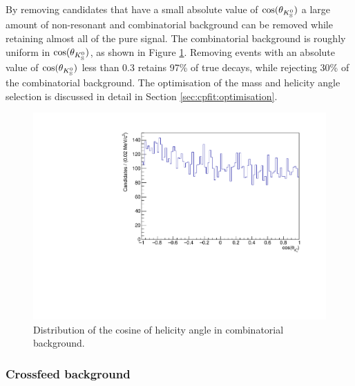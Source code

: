 By removing candidates that have a small absolute value of $\cos(\theta_{{{K}^0_{\mathrm{ \scriptscriptstyle S}}}})$ a large amount of non-resonant \decay{\Bm}{\D\KS\pim} and combinatorial background can be removed while retaining almost all of the pure \decay{\Bm}{\D\Kstarm} signal. The combinatorial background is roughly uniform in $\cos(\theta_{{{K}^0_{\mathrm{ \scriptscriptstyle S}}}})$, as shown in Figure \ref{Kshelicitybkg}. Removing events with an absolute value of $\cos(\theta_{{{K}^0_{\mathrm{ \scriptscriptstyle S}}}})$ less than 0.3 retains 97\% of true \decay{\Bm}{\D\Kstarm} decays, while rejecting 30\% of the combinatorial background. The optimisation of the \Kstarm mass and \KS helicity angle selection is discussed in detail in Section \ref{sec:cpfit:optimisation}.

\begin{figure}
\centering
\includegraphics[width=0.5\linewidth]{figures/backgrounds/Kshelicity_background.pdf}
\caption{Distribution of the cosine of \KS helicity angle in \kpi combinatorial background.}
\label{Kshelicitybkg}
\end{figure}

\subsubsection{Crossfeed background}
\label{sec:backgrounds:crossfeed}

